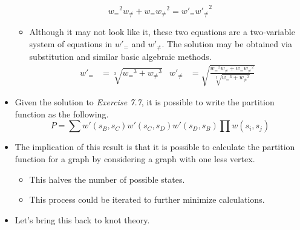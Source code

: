 \documentclass[titlepage]{article}
\numberwithin{figure}{section}
\numberwithin{table}{section}
\numberwithin{equation}{section}
\begin{document}
\begin{itemize}
\begin{equation*}
        {w_=}^2{w_{\neq}}+{w_=}{w_{\neq}}^2 = {w'_=}{w'_{\neq}}^2
    \end{equation*}
    \begin{itemize}
        \item Although it may not look like it, these two equations are a two-variable system of equations in $w'_=$ and $w'_{\neq}$. The solution may be obtained via substitution and similar basic algebraic methods.
        \begin{align*}
            w'_= &= \sqrt[3]{{w_=}^3+{w_{\neq}}^3} & 
            w'_{\neq} &= \sqrt{\frac{{w_=}^2{w_{\neq}}+{w_=}{w_{\neq}}^2}{\sqrt[3]{{w_=}^3+{w_{\neq}}^3}}}
        \end{align*}
    \end{itemize}
    \item Given the solution to \emph{Exercise 7.7}, it is possible to write the partition function as the following.
    \begin{equation*}
        P = \sum w'(s_B,s_C)w'(s_C,s_D)w'(s_D,s_B)\prod w(s_i,s_j)
    \end{equation*}
    \item The implication of this result is that it is possible to calculate the partition function for a graph by considering a graph with one less vertex.
    \begin{itemize}
        \item This halves the number of possible states.
        \item This process could be iterated to further minimize calculations.
    \end{itemize}
    \item Let's bring this back to knot theory.
    \begin{figure}[h!]
        \centering
\end{figure}
\end{itemize}
\end{document}
